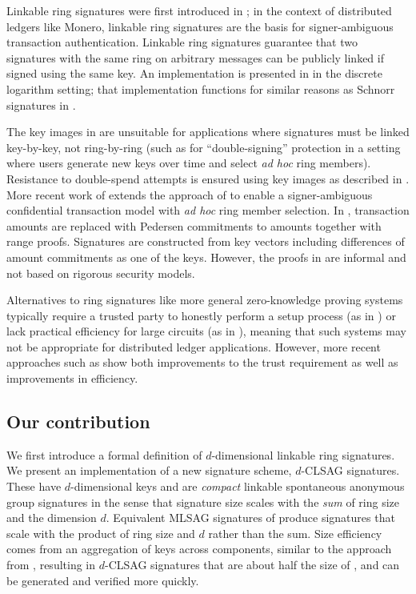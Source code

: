 \documentclass{mrl}
\theoremstyle{plain}
\theoremstyle{definition}
\begin{document}
Linkable ring signatures were first introduced in \cite{liu}; in the context of distributed ledgers like Monero, linkable ring signatures are the basis for signer-ambiguous transaction authentication.  Linkable ring signatures guarantee that two signatures with the same ring on arbitrary messages can be publicly linked if signed using the same key. An implementation is presented in \cite{liu} in the discrete logarithm setting; that implementation functions for similar reasons as Schnorr signatures in \cite{schnorr1991efficient}. 

The key images in \cite{liu} are unsuitable for applications where signatures must be linked key-by-key, not ring-by-ring (such as for ``double-signing'' protection in a setting where users generate new keys over time and select \textit{ad hoc} ring members). Resistance to double-spend attempts is ensured using key images as described in \cite{van2013cryptonote}. More recent work of \cite{noether} extends the approach of \cite{liu} to enable a signer-ambiguous confidential transaction model with \textit{ad hoc} ring member selection. In \cite{noether}, transaction amounts are replaced with Pedersen commitments to amounts together with range proofs. Signatures are constructed from key vectors including differences of amount commitments as one of the keys. However, the proofs in \cite{noether} are informal and not based on rigorous security models. 

Alternatives to ring signatures like more general zero-knowledge proving systems typically require a trusted party to honestly perform a setup process (as in \cite{groth,ben2014succinct,groth2018updatable}) or lack practical efficiency for large circuits (as in \cite{bulletproofs}), meaning that such systems may not be appropriate for distributed ledger applications. However, more recent approaches such as \cite{bowehalo,hoffmann2019efficient} show both improvements to the trust requirement as well as improvements in efficiency.


\subsection{Our contribution}
We first introduce a formal definition of $d$-dimensional linkable ring signatures. We present an implementation of a new signature scheme, $d$-CLSAG signatures. These have $d$-dimensional keys and are \textit{compact} linkable spontaneous anonymous group signatures in the sense that signature size scales with the \textit{sum} of ring size and the dimension $d$. Equivalent MLSAG signatures of \cite{noether} produce signatures that scale with the product of ring size and $d$ rather than the sum. Size efficiency comes from an aggregation of keys across components, similar to the approach from \cite{maxwell2018simple,qian2010non}, resulting in $d$-CLSAG signatures that are about half the size of \cite{noether}, and can be generated and verified more quickly.  
\end{document}
